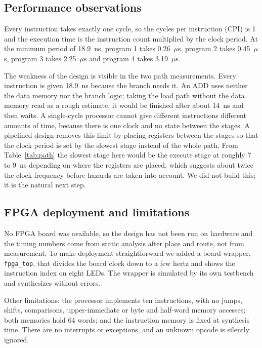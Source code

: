 \documentclass[conference]{IEEEtran}
\begin{document}
\subsection{Performance observations}
Every instruction takes exactly one cycle, so the cycles per instruction
(CPI) is 1 and the execution time is the instruction count multiplied by the
clock period. At the minimum period of 18.9~ns, program 1 takes
0.26~$\mu$s, program 2 takes 0.45~$\mu$s, program 3 takes 2.25~$\mu$s and
program 4 takes 3.19~$\mu$s.

The weakness of the design is visible in the two path measurements. Every
instruction is given 18.9~ns because the branch needs it. An ADD uses
neither the data memory nor the branch logic; taking the load path without
the data memory read as a rough estimate, it would be finished after about
14~ns and then waits. A single-cycle processor cannot give different
instructions different amounts of time, because there is one clock and no
state between the stages. A pipelined design removes this limit by placing
registers between the stages so that the clock period is set by the slowest
stage instead of the whole path. From Table~\ref{tab:path} the slowest
stage here would be the execute stage at roughly 7 to 9~ns depending on
where the registers are placed, which suggests about twice the clock
frequency before hazards are taken into account. We did not build this; it
is the natural next step.

\subsection{FPGA deployment and limitations}
No FPGA board was available, so the design has not been run on hardware and
the timing numbers come from static analysis after place and route, not
from measurement. To make deployment straightforward we added a board
wrapper, \texttt{fpga\_top}, that divides the board clock down to a few
hertz and shows the instruction index on eight LEDs. The wrapper is
simulated by its own testbench and synthesizes without errors.

Other limitations: the processor implements ten instructions, with no
jumps, shifts, comparisons, upper-immediate or byte and half-word memory
accesses; both memories hold 64 words; and the instruction memory is fixed
at synthesis time. There are no interrupts or exceptions, and an unknown
opcode is silently ignored.

\end{document}
